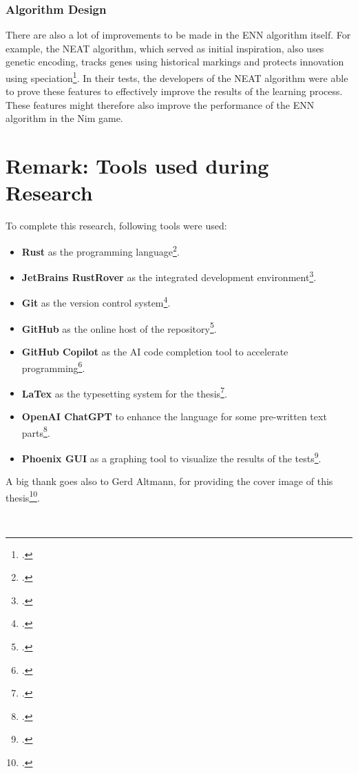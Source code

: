 \subsubsection{Algorithm Design}
There are also a lot of improvements to be made in the ENN algorithm itself.
For example, the NEAT algorithm, which served as initial inspiration, also uses genetic encoding, tracks genes using historical markings and protects innovation using speciation\footcite{Neat_02}.
In their tests, the developers of the NEAT algorithm were able to prove these features to effectively improve the results of the learning process.
These features might therefore also improve the performance of the ENN algorithm in the Nim game.

\section{Remark: Tools used during Research}
To complete this research, following tools were used:
\begin{itemize}
    \item \textbf{Rust} as the programming language\footcite{rust23}.
    \item \textbf{JetBrains RustRover} as the integrated development environment\footcite{rustrover}.
    \item \textbf{Git} as the version control system\footcite{git}.
    \item \textbf{GitHub} as the online host of the repository\footcite{github}.
    \item \textbf{GitHub Copilot} as the AI code completion tool to accelerate programming\footcite{github_copilot2021}.
    \item \textbf{LaTex} as the typesetting system for the thesis\footcite{latex}.
    \item \textbf{OpenAI ChatGPT} to enhance the language for some pre-written text parts\footcite{chatgpt}.
    \item \textbf{Phoenix GUI} as a graphing tool to visualize the results of the tests\footcite{phoenixgui}.
\end{itemize}
A big thank goes also to Gerd Altmann, for providing the cover image of this thesis\footcite{pixabay_neuronen}.
\cleardoublepage %
\printbibliography[title=References]
\\
\vspace*{3em}
